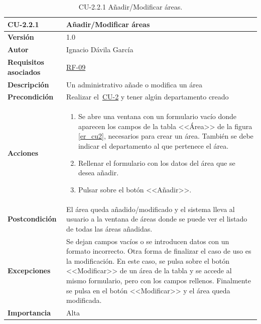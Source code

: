 \begin{table}[p]
\label{table:CU-2.2.1}
	\centering
	\begin{tabularx}{\linewidth}{ p{} p{} }
		\toprule
		\textbf{CU-2.2.1}    & \textbf{Añadir/Modificar áreas}\\
		\toprule
		\textbf{Versión}              & 1.0    \\
		\textbf{Autor}                & Ignacio Dávila García \\
		\textbf{Requisitos asociados} & \hyperref[itm:RF9]{RF-09} \\
		\textbf{Descripción}          & Un administrativo añade o modifica un área \\
		\textbf{Precondición}         & Realizar el~\hyperref[table:CU-2]{CU-2} y tener algún departamento creado \\
		\textbf{Acciones}             &
		\begin{enumerate}
			\def\labelenumi{\arabic{enumi}.}
			\tightlist
			\item Se abre una ventana con un formulario vacío donde aparecen los campos de la tabla <<Área>> de la figura \ref{er_cu2}, necesarios para crear un área. También se debe indicar el departamento al que pertenece el área.
			\item Rellenar el formulario con los datos del área que se desea añadir.
			\item Pulsar sobre el botón <<Añadir>>.
		\end{enumerate}\\
		\textbf{Postcondición}        & El área queda añadido/modificado y el sistema lleva al usuario a la ventana de áreas donde se puede ver el listado de todas las áreas añadidas. \\
		\textbf{Excepciones}          & Se dejan campos vacíos o se introducen datos con un formato incorrecto. Otra forma de finalizar el caso de uso es la modificación. En este caso, se pulsa sobre el botón <<Modificar>> de un área de la tabla y se accede al mismo formulario, pero con los campos rellenos. Finalmente se pulsa en el botón <<Modificar>> y el área queda modificada. \\
		\textbf{Importancia}          & Alta \\
		\bottomrule
	\end{tabularx}
	\caption{CU-2.2.1 Añadir/Modificar áreas.}
\end{table}
\FloatBarrier


